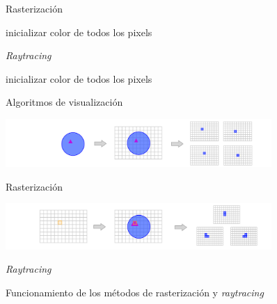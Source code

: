 \begin{figure}[ht!]
    \centering
    \begin{minipage}{0.47\textwidth}
        \begin{algorithm}[H]
            \caption{Rasterización}
            inicializar color de todos los pixels
            
        \end{algorithm}
    \end{minipage}%
    \hfill
    \begin{minipage}{0.47\textwidth}
        \begin{algorithm}[H]
            \caption{\textit{Raytracing}}
            inicializar color de todos los pixels
            
        \end{algorithm}
    \end{minipage}%
    \caption{Algoritmos de visualización}
    \label{fig:algVis}
\end{figure}

\begin{figure}[!ht]
     \begin{minipage}[c]{0.98\linewidth}
        \centering
        \includegraphics[width=0.9\textwidth]{Plantilla-TFG-master/img/rasterizacion.png}
        \caption{Rasterización}
     \end{minipage}
     \begin{minipage}[c]{0.98\linewidth}
        \centering
        \includegraphics[width=0.9\textwidth]{Plantilla-TFG-master/img/raytracing.png}
        \caption{\textit{Raytracing}}
     \end{minipage}
     \caption{Funcionamiento de los métodos de rasterización y \textit{raytracing}}
     \label{fig:colorPixels}
\end{figure}

